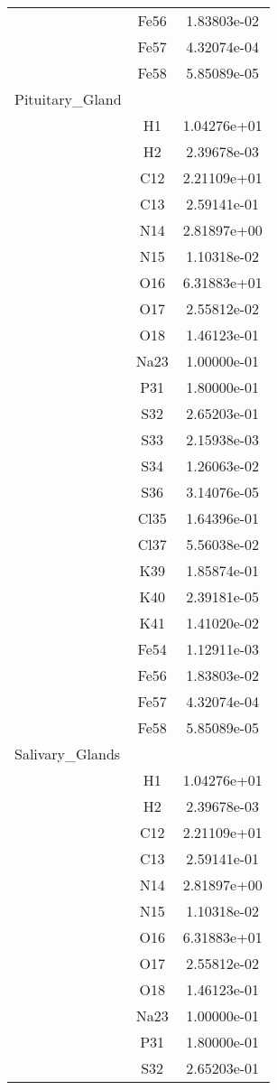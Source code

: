 \begin{centering}
\begin{longtable}{l c c}
& Fe56 & 1.83803e-02 \\ 
& Fe57 & 4.32074e-04 \\ 
& Fe58 & 5.85089e-05 \\ 
\hline
Pituitary\_Gland & & \\
\hline
& H1 & 1.04276e+01 \\ 
& H2 & 2.39678e-03 \\ 
& C12 & 2.21109e+01 \\ 
& C13 & 2.59141e-01 \\ 
& N14 & 2.81897e+00 \\ 
& N15 & 1.10318e-02 \\ 
& O16 & 6.31883e+01 \\ 
& O17 & 2.55812e-02 \\ 
& O18 & 1.46123e-01 \\ 
& Na23 & 1.00000e-01 \\ 
& P31 & 1.80000e-01 \\ 
& S32 & 2.65203e-01 \\ 
& S33 & 2.15938e-03 \\ 
& S34 & 1.26063e-02 \\ 
& S36 & 3.14076e-05 \\ 
& Cl35 & 1.64396e-01 \\ 
& Cl37 & 5.56038e-02 \\ 
& K39 & 1.85874e-01 \\ 
& K40 & 2.39181e-05 \\ 
& K41 & 1.41020e-02 \\ 
& Fe54 & 1.12911e-03 \\ 
& Fe56 & 1.83803e-02 \\ 
& Fe57 & 4.32074e-04 \\ 
& Fe58 & 5.85089e-05 \\ 
\hline
Salivary\_Glands & & \\
\hline
& H1 & 1.04276e+01 \\ 
& H2 & 2.39678e-03 \\ 
& C12 & 2.21109e+01 \\ 
& C13 & 2.59141e-01 \\ 
& N14 & 2.81897e+00 \\ 
& N15 & 1.10318e-02 \\ 
& O16 & 6.31883e+01 \\ 
& O17 & 2.55812e-02 \\ 
& O18 & 1.46123e-01 \\ 
& Na23 & 1.00000e-01 \\ 
& P31 & 1.80000e-01 \\ 
& S32 & 2.65203e-01 \\ 

\end{longtable}
\end{centering}
